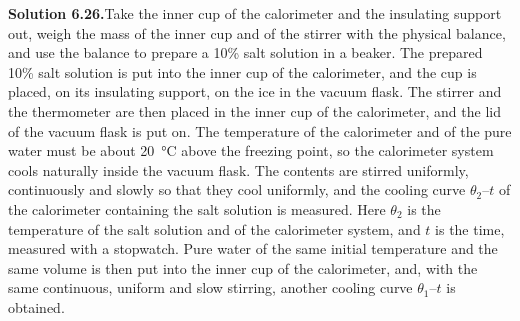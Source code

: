 \medskip
\noindent\textbf{Solution 6.26.}\quad Take the inner cup of the calorimeter and the insulating support out, weigh the mass of the inner cup and of the stirrer with the physical balance, and use the balance
to prepare a 10\% salt solution in a beaker. The prepared 10\% salt solution is put into the inner cup of the calorimeter, and the cup is placed, on its insulating support, on the ice in the vacuum flask. The stirrer and the thermometer are then placed in the inner cup of the calorimeter, and the lid of the vacuum flask is put on. The temperature of the calorimeter and of the pure water must be about \SI{20}{\celsius} above the freezing point, so the calorimeter system cools naturally inside the vacuum flask. The contents are stirred uniformly, continuously and slowly so that they cool uniformly, and the cooling curve $\theta_2$--$t$ of the calorimeter containing the salt solution is measured. Here $\theta_2$ is the temperature of the salt solution and of the calorimeter system, and $t$ is the time, measured with a stopwatch. Pure water of the same initial temperature and the same volume is then put into the inner cup of the calorimeter, and, with the same continuous, uniform and slow stirring, another cooling curve $\theta_1$--$t$ is obtained.

